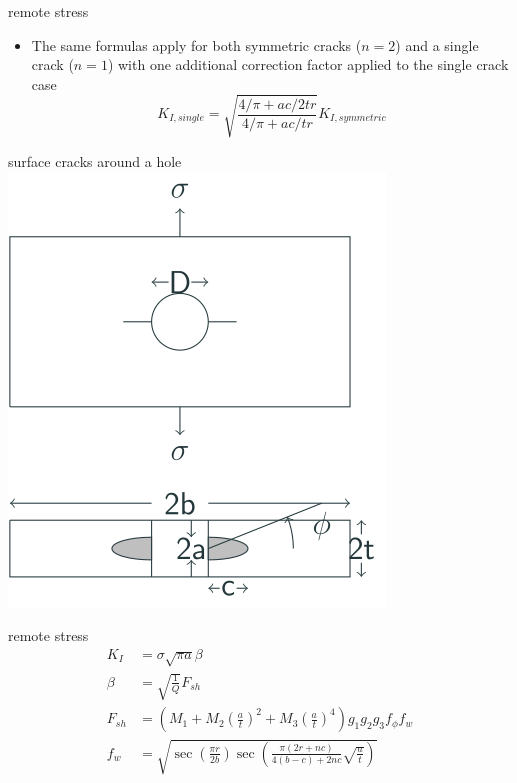 \documentclass[
  letterpaper,
  ignorenonframetext,
  aspectratio=43,
  handout,
  12pt]{beamer}
\providecommand{\tightlist}{%
  \setlength{\itemsep}{0pt}\setlength{\parskip}{0pt}}
\providecommand{\tightlist}{%
\setlength{\itemsep}{0pt}\setlength{\parskip}{0pt}}
\let\Oldincludegraphics\includegraphics
\renewcommand{\includegraphics}[2][]{\Oldincludegraphics[width=\textwidth,height=0.7\textheight,keepaspectratio]{#2}}
\begin{document}
\begin{frame}{remote stress}
\protect\hypertarget{remote-stress-2}{}
\begin{itemize}
\tightlist
\item
  The same formulas apply for both symmetric cracks (\(n=2\)) and a
  single crack (\(n=1\)) with one additional correction factor applied
  to the single crack case
  \[K_{I,single} = \sqrt{\frac{4/\pi + ac/2tr}{4/\pi + ac/tr}}K_{I,symmetric}\]
\end{itemize}
\end{frame}

\begin{frame}{surface cracks around a hole}
\protect\hypertarget{surface-cracks-around-a-hole}{}
\includegraphics{../images/bearing-surface.svg}
\end{frame}

\begin{frame}{remote stress}
\protect\hypertarget{remote-stress-3}{}
\[\begin{aligned}
  K_{I} &= \sigma \sqrt{\pi a} \beta\\
  \beta &= \sqrt{\frac{1}{Q}} F_{sh}\\
  F_{sh} &= \left(M_1 + M_2 \left(\frac{a}{t}\right)^2 + M_3 \left(\frac{a}{t}\right)^4\right)g_1 g_2 g_3 f_\phi f_w\\
  f_w &= \sqrt{\sec \left(\frac{\pi r}{2b}\right)\sec \left(\frac{\pi (2r + nc)}{4(b-c) + 2nc} \sqrt{\frac{a}{t}}\right)}
\end{aligned}\]
\end{frame}
\end{document}

